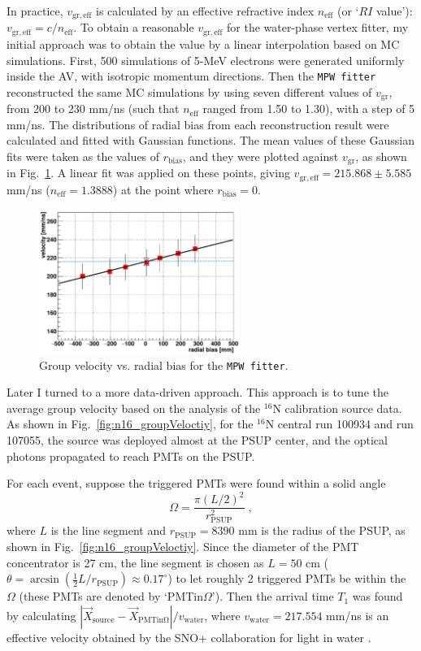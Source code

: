 In practice, $v_\mathrm{gr,eff}$ is calculated by an effective refractive index $n_\mathrm{eff}$ (or `$RI$ value'): $v_\mathrm{gr,eff}=c/n_\mathrm{eff}$. To obtain a reasonable $v_\mathrm{gr,eff}$ for the water-phase vertex fitter, my initial approach was to obtain the value by a linear interpolation based on MC simulations. First, 500 simulations of 5-MeV electrons were generated uniformly inside the AV, with isotropic momentum directions. Then the \texttt{MPW fitter} reconstructed the same MC simulations by using seven different values of $v_\mathrm{gr}$, from 200 to 230 mm/ns (such that $n_\mathrm{eff}$ ranged from 1.50 to 1.30), with a step of 5 mm/ns. The distributions of radial bias from each reconstruction result were calculated and fitted with Gaussian functions. The mean values of these Gaussian fits were taken as the values of $r_\mathrm{bias}$, and they were plotted against $v_\mathrm{gr}$, as shown in Fig.~\ref{fig:plotVgr}. A linear fit was applied on these points, giving $v_\mathrm{gr,eff}=215.868\pm 5.585$ mm/ns ($n_\mathrm{eff}=1.3888$) at the point where $r_\mathrm{bias}=0$.

\begin{figure}[!htb]
	\centering
	\includegraphics[width=6.5cm]{tune_groupVelocity_MPW.png}
	\caption[Group velocity vs. radial bias for the \texttt{MPW fitter}.]{Group velocity vs. radial bias for the \texttt{MPW fitter}. \label{fig:plotVgr}}
\end{figure}

Later I turned to a more data-driven approach. This approach is to tune the average group velocity based on the analysis of the $^{16}$N calibration source data. As shown in Fig.~\ref{fig:n16_groupVeloctiy}, for the $^{16}$N central run 100934 and run 107055, the source was deployed almost at the PSUP center, and the optical photons propagated to reach PMTs on the PSUP. 

For each event, suppose the triggered PMTs were found within a solid angle
\begin{equation*}
\Omega=\frac{\pi(L/2)^2}{r^2_\mathrm{PSUP}}\; ,
\end{equation*}
where $L$ is the line segment and $r_\mathrm{PSUP}=8390$ mm is the radius of the PSUP, as shown in Fig.~\ref{fig:n16_groupVeloctiy}. Since the diameter of the PMT concentrator is 27 cm, the line segment is chosen as $L = 50$ cm ($\theta=\arcsin(\frac{1}{2}L/r_\mathrm{PSUP})\approx 0.17^\circ$) to let roughly 2 triggered PMTs be within the $\Omega$ (these PMTs are denoted by `PMTin$\Omega$'). Then the arrival time $T_1$ was found by calculating $|\vec{X}_\mathrm{source}-\vec{X}_\mathrm{PMTin\Omega}|/v_\mathrm{water}$, where $v_\mathrm{water}=217.554$ mm/ns is an effective velocity obtained by the SNO+ collaboration for light in water \cite{coulter2013modelling}.

